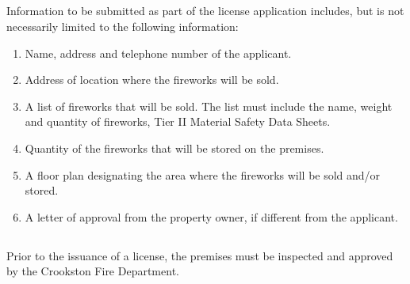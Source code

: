 \subsection{}
Information to be submitted as part of the license application includes, but is not necessarily limited to the following information:  
\begin{enumerate}[{\indent}1)]
    \item Name, address and telephone number of the applicant. 
    \item Address of location where the fireworks will be sold. 
    \item A list of fireworks that will be sold. The list must include the name, weight and quantity of fireworks, Tier II Material Safety Data Sheets. 
    \item Quantity of the fireworks that will be stored on the premises. 
    \item A floor plan designating the area where the fireworks will be sold and/or stored. 
    \item A letter of approval from the property owner, if different from the applicant. 
\end{enumerate}
\subsection{}
Prior to the issuance of a license, the premises must be inspected and approved by the Crookston Fire Department.

